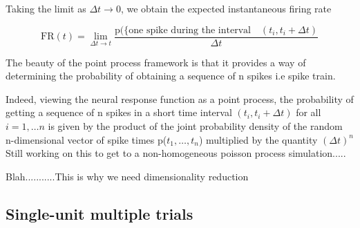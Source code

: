 Taking the limit as $\Delta t \rightarrow 0$, we obtain the expected instantaneous  firing rate
 
\begin{equation}\label{expected instant Firerate}
\displaystyle 
\text{FR}(t) =  \lim_{\Delta t \rightarrow t}  \dfrac{\text{p}(\{\text{one spike during the interval} \quad (t_{i}, t_{i}+\Delta t)}{\Delta t} 
\end{equation}


The beauty of the point process framework is that it provides a way of determining the probability of obtaining a sequence of n spikes i.e spike train.

Indeed, viewing the neural response function as a point process, the
probability of getting a sequence of n spikes in a short time interval
$(t_{i}, t_{i}+\Delta t)$ for all $i=1, \ldots n$ is given by the
product of the joint probability density of the random n-dimensional
vector of spike times p($t_{1}, \ldots, t_{n}$) multiplied by the quantity
$(\Delta t)^{n}$\\


Still working on this to get to a non-homogeneous poisson process simulation.....



Blah...........This is why we need dimensionality reduction






\subsection{Single-unit multiple trials}


